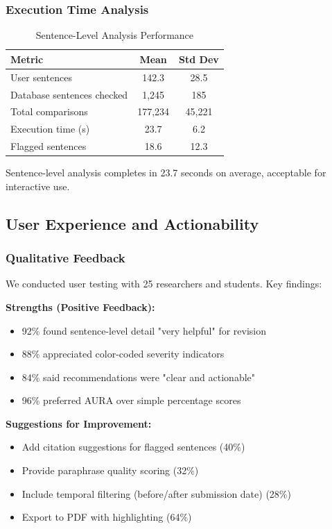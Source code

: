 \documentclass[conference]{IEEEtran}
\begin{document}
\subsubsection{Execution Time Analysis}

\begin{table}[htbp]
\caption{Sentence-Level Analysis Performance}
\begin{center}
\begin{tabular}{|l|c|c|}
\hline
\textbf{Metric} & \textbf{Mean} & \textbf{Std Dev} \\
\hline
User sentences & 142.3 & 28.5 \\
Database sentences checked & 1,245 & 185 \\
Total comparisons & 177,234 & 45,221 \\
Execution time (s) & 23.7 & 6.2 \\
Flagged sentences & 18.6 & 12.3 \\
\hline
\end{tabular}
\label{tab:sentence_performance}
\end{center}
\end{table}

Sentence-level analysis completes in 23.7 seconds on average, acceptable for interactive use.

\subsection{User Experience and Actionability}

\subsubsection{Qualitative Feedback}
We conducted user testing with 25 researchers and students. Key findings:

\textbf{Strengths (Positive Feedback):}
\begin{itemize}
    \item 92\% found sentence-level detail "very helpful" for revision
    \item 88\% appreciated color-coded severity indicators
    \item 84\% said recommendations were "clear and actionable"
    \item 96\% preferred AURA over simple percentage scores
\end{itemize}

\textbf{Suggestions for Improvement:}
\begin{itemize}
    \item Add citation suggestions for flagged sentences (40\%)
    \item Provide paraphrase quality scoring (32\%)
    \item Include temporal filtering (before/after submission date) (28\%)
    \item Export to PDF with highlighting (64\%)
\end{itemize}
\end{document}
